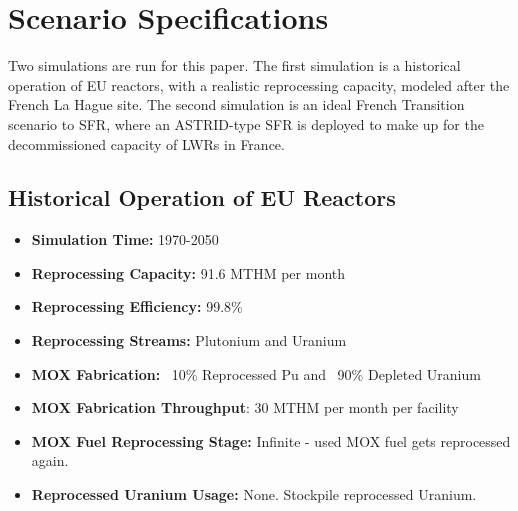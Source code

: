 \section{Scenario Specifications}

Two simulations are run for this paper.
The first simulation is a historical operation of \gls{EU} reactors, with a
realistic reprocessing capacity, modeled after the French La Hague site.
The second simulation is an ideal French Transition scenario to \gls{SFR},
where an ASTRID-type \gls{SFR} is deployed to make up for the decommissioned
capacity of \glspl{LWR} in France.

\subsection{Historical Operation of \gls{EU} Reactors}
\begin{itemize}
	\item \textbf{Simulation Time:}  1970-2050 
	\item \textbf{Reprocessing Capacity:}  91.6 MTHM per month \cite{schneider_spent_2008}  
	\item \textbf{Reprocessing Efficiency:}  99.8\%  
	\item \textbf{Reprocessing Streams:}  Plutonium and Uranium  
	\item \textbf{\gls{MOX} Fabrication:}  ~10\% Reprocessed Pu and ~90\% Depleted Uranium  
	\item \textbf{\gls{MOX} Fabrication Throughput}: 30 MTHM per month per facility \cite{hugelmann_melox_1999}
	\item \textbf{\gls{MOX} Fuel Reprocessing Stage:}  Infinite - used \gls{MOX} fuel gets reprocessed again.  
	\item\textbf{Reprocessed Uranium Usage:}  None. Stockpile reprocessed Uranium. \\
\end{itemize} 

